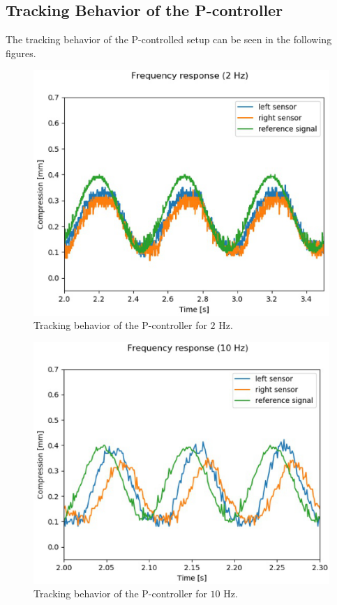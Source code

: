 	\subsection{Tracking Behavior of the P-controller}
	The tracking behavior of the P-controlled setup can be seen in the following figures.
	\begin{figure}[h!]
		\centering
		\includegraphics[width=0.6\linewidth]{Figs/2plot_zoom_P}
		\caption{Tracking behavior of the P-controller for $2$ Hz.}
		\label{fig:2plot_zoom_P}
	\end{figure}
	\begin{figure}[h!]
		\centering
		\includegraphics[width=0.6\linewidth]{Figs/10plot_zoom_P}
		\caption{Tracking behavior of the P-controller for $10$ Hz.}
		\label{fig:10plot_zoom_P}
	\end{figure}
	
	

